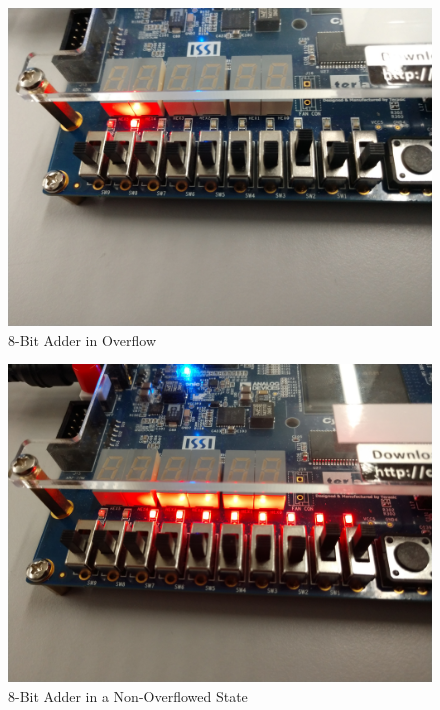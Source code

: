 \documentclass[
	letterpaper, %
	10pt, %
]{CSUniSchoolLabReport}
\begin{document}
\begin{figure}[h!]
  \centering
  \includegraphics[width=.9\textwidth]{Figures/8BOverflow.jpg}
  \caption{8-Bit Adder in Overflow}
  \label{fig:12}
\end{figure}

\begin{figure}[h!]
  \centering
  \includegraphics[width=.9\textwidth]{Figures/8BNormal.jpg}
  \caption{8-Bit Adder in a Non-Overflowed State}
  \label{fig:13}
\end{figure}
\end{document}
